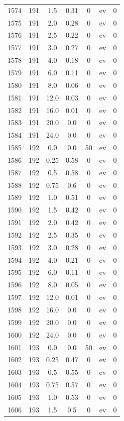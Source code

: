 \documentclass[12pt,a4paper]{article}
\begin{document}
\begin{tabular}{r|cccccc}
	1574 & 191 & 1.5 & 0.31 & 0 & ev & 0 \\
	1575 & 191 & 2.0 & 0.28 & 0 & ev & 0 \\
	1576 & 191 & 2.5 & 0.22 & 0 & ev & 0 \\
	1577 & 191 & 3.0 & 0.27 & 0 & ev & 0 \\
	1578 & 191 & 4.0 & 0.18 & 0 & ev & 0 \\
	1579 & 191 & 6.0 & 0.11 & 0 & ev & 0 \\
	1580 & 191 & 8.0 & 0.06 & 0 & ev & 0 \\
	1581 & 191 & 12.0 & 0.03 & 0 & ev & 0 \\
	1582 & 191 & 16.0 & 0.01 & 0 & ev & 0 \\
	1583 & 191 & 20.0 & 0.0 & 0 & ev & 0 \\
	1584 & 191 & 24.0 & 0.0 & 0 & ev & 0 \\
	1585 & 192 & 0.0 & 0.0 & 50 & ev & 0 \\
	1586 & 192 & 0.25 & 0.58 & 0 & ev & 0 \\
	1587 & 192 & 0.5 & 0.58 & 0 & ev & 0 \\
	1588 & 192 & 0.75 & 0.6 & 0 & ev & 0 \\
	1589 & 192 & 1.0 & 0.51 & 0 & ev & 0 \\
	1590 & 192 & 1.5 & 0.42 & 0 & ev & 0 \\
	1591 & 192 & 2.0 & 0.42 & 0 & ev & 0 \\
	1592 & 192 & 2.5 & 0.35 & 0 & ev & 0 \\
	1593 & 192 & 3.0 & 0.28 & 0 & ev & 0 \\
	1594 & 192 & 4.0 & 0.21 & 0 & ev & 0 \\
	1595 & 192 & 6.0 & 0.11 & 0 & ev & 0 \\
	1596 & 192 & 8.0 & 0.05 & 0 & ev & 0 \\
	1597 & 192 & 12.0 & 0.01 & 0 & ev & 0 \\
	1598 & 192 & 16.0 & 0.0 & 0 & ev & 0 \\
	1599 & 192 & 20.0 & 0.0 & 0 & ev & 0 \\
	1600 & 192 & 24.0 & 0.0 & 0 & ev & 0 \\
	1601 & 193 & 0.0 & 0.0 & 50 & ev & 0 \\
	1602 & 193 & 0.25 & 0.47 & 0 & ev & 0 \\
	1603 & 193 & 0.5 & 0.55 & 0 & ev & 0 \\
	1604 & 193 & 0.75 & 0.57 & 0 & ev & 0 \\
	1605 & 193 & 1.0 & 0.53 & 0 & ev & 0 \\
	1606 & 193 & 1.5 & 0.5 & 0 & ev & 0 \\

\end{tabular}
\end{document}
